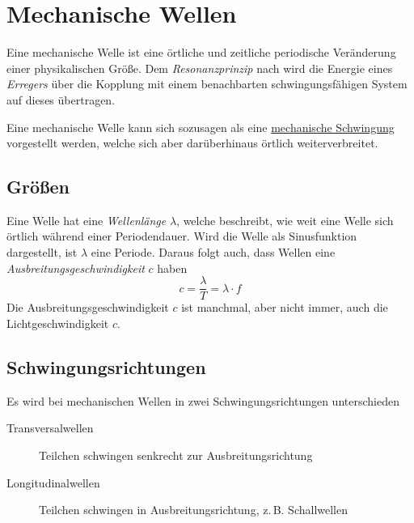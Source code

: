 \documentclass{article}
\begin{document}
\section{Mechanische Wellen} 
Eine mechanische Welle ist eine örtliche und zeitliche periodische Veränderung einer physikalischen Größe. Dem \emph{Resonanzprinzip} nach wird die Energie eines \emph{Erregers} über die Kopplung mit einem benachbarten schwingungsfähigen System auf dieses übertragen.
 
Eine mechanische Welle kann sich sozusagen als eine \hyperref[Mechanische Schwingungen]{mechanische Schwingung} vorgestellt werden, welche sich aber darüberhinaus örtlich weiterverbreitet.
 
\subsection{Größen} 
Eine Welle hat eine \emph{Wellenlänge} $\lambda$, welche beschreibt, wie weit eine Welle sich örtlich während einer Periodendauer. Wird die Welle als Sinusfunktion dargestellt, ist $\lambda$ eine Periode. Daraus folgt auch, dass Wellen eine \emph{Ausbreitungsgeschwindigkeit} $c$ haben
\[
 c = \frac{\lambda}{T} = \lambda \cdot f 
\]
Die Ausbreitungsgeschwindigkeit $c$ ist manchmal, aber nicht immer, auch die Lichtgeschwindigkeit $c$.
 
\subsection{Schwingungsrichtungen} 
Es wird bei mechanischen Wellen in zwei Schwingungsrichtungen unterschieden
\begin{description}
 \item[Transversalwellen] Teilchen schwingen senkrecht zur Ausbreitungsrichtung
 \item[Longitudinalwellen] Teilchen schwingen in Ausbreitungsrichtung, z.\,B. Schallwellen
\end{description} 
\end{document}
